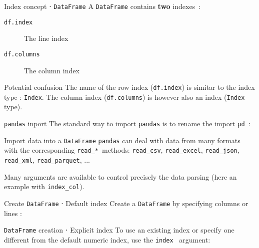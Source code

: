 \begin{frame}{Index concept ⋅ \texttt{DataFrame}}
  A \texttt{DataFrame} contains \textbf{two} indexes~:
  \begin{description}
    \item[\texttt{df.index}] The line index
    \item[\texttt{df.columns}] The column index
  \end{description}


  \begin{alertblock}{Potential confusion}
    The name of the row index (\texttt{df.index}) is simitar to the index type : \texttt{Index}.
    The column index (\texttt{df.columns}) is however also an index (\texttt{Index} type).
  \end{alertblock}
\end{frame}

\begin{frame}{\texttt{pandas} inport}
  The standard way to import \texttt{pandas} is to rename the import \texttt{pd}~:
\end{frame}

\begin{frame}{Import data into a \texttt{DataFrame}}
  \texttt{pandas} can deal with data from many formats with the corresponding \texttt{read\_*}~methods: \texttt{read\_csv}, \texttt{read\_excel}, \texttt{read\_json}, \texttt{read\_xml}, \texttt{read\_parquet}, ...


  Many arguments are available to control precisely the data parsing (here an example with \texttt{index\_col}).
\end{frame}

\begin{frame}{Create \texttt{DataFrame} ⋅ Default index}
  Create a \texttt{DataFrame} by specifying columns or lines :

\end{frame}

\begin{frame}{\texttt{DataFrame} creation ⋅ Explicit index}
  To use an existing index or specify one different from the default numeric index, use the \texttt{index}~ argument:

\end{frame}

